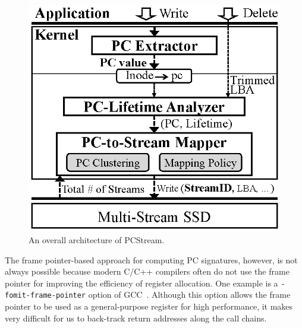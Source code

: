 \begin{figure}[t]
	\centering
	\includegraphics[width=0.6\linewidth]{figure/pcstream/architecture4}
	\caption{An overall architecture of \textsf{\small PCStream}.}
	\label{fig:architecture}
\end{figure}


The frame pointer-based approach for computing PC signatures, however, is not
always possible because modern C/C++ compilers often do not use the frame
pointer for improving the efficiency of register allocation.
One example is a
{\tt -fomit-frame-pointer} option of GCC~\cite{GCC}. 
Although this option allows the frame pointer to be used as a general-purpose
register for high performance, it makes very difficult for us to back-track
return addresses along the call chains.  

